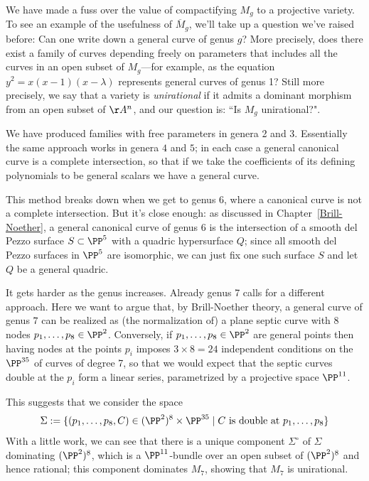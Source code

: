 We have made a fuss over the value of compactifying $M_g$ to a projective variety. To see an example of the usefulness of $\overline M_g$, we'll take up a question we've raised before: Can one write down a general curve of genus $g$?
More precisely,  does there exist a family of curves depending freely on parameters that includes all the curves in an open subset of $M_{g}$---for example, as the equation $y^{2} = x(x-1)(x-\lambda)$ represents general curves of genus 1? Still more precisely,
we say that a variety is \emph{unirational} if it admits a dominant morphism from an open subset of $\AA^{n}$, and our question is: ``Is $M_g$ unirational?". 

We have produced  families with free parameters in genera 2 and 3. Essentially
the same approach works in genera $4$ and $5$; in each case a general canonical curve is a complete intersection, so that if we take the coefficients of its defining polynomials to be general scalars we have a general curve.

This method breaks down when we get to genus 6, where a canonical curve is not a complete intersection. But it's close enough: as discussed in Chapter~\ref{Brill-Noether}, a general canonical curve of genus 6 is the intersection of a smooth del Pezzo surface $S \subset \PP^5$ with a quadric hypersurface $Q$; since all smooth del Pezzo surfaces in $\PP^5$ are isomorphic, we can just fix one such surface $S$ and let $Q$ be a general quadric.

It gets harder as the genus increases. Already genus 7 calls for a different approach. Here we want to argue that, by Brill-Noether theory, a general curve of genus $7$ can be realized as (the normalization of) a plane septic curve with 8 nodes $p_1,\dots,p_8 \in \PP^2$. Conversely, if $p_1,\dots,p_8 \in \PP^2$ are general points then having nodes at the points $p_i$ imposes $ 3\times 8 = 24$ independent conditions on the $\PP^{35}$ of curves of degree 7, so that we would expect that the septic curves double at the $p_i$ form a linear series, parametrized by a projective space $\PP^{11}$.

This suggests that we consider the space
$$
\Sigma := \{ (p_1,\dots,p_8,C) \in (\PP^2)^8 \times \PP^{35} \mid C \text{ is double at } p_1,\dots,p_8 \}
$$
With a little work, we can see that there is a unique component $\Sigma^\circ$ of $\Sigma$ dominating $(\PP^2)^8$, which is a $\PP^{11}$-bundle over an open subset of $(\PP^2)^8$ and hence rational; this component dominates $M_7$, showing that $M_7$ is unirational.

